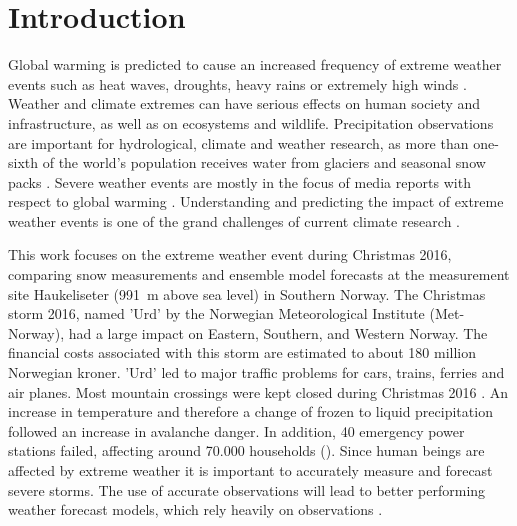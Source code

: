 \chapter{Introduction}
\label{ch:intro}
Global warming is predicted to cause an increased frequency of extreme weather events such as heat waves, droughts, heavy rains or extremely high winds \citep{hansen_warmer_2014}. Weather and climate extremes can have serious effects on human society and infrastructure, as well as on ecosystems and wildlife.
Precipitation observations are important for hydrological, climate and weather research, as more than one-sixth of the world's population receives water from glaciers and seasonal snow packs \citep{barnett_potential_2005}. Severe weather events are mostly in the focus of media reports with respect to global warming \citep{meehl_introduction_2000}. Understanding and predicting the impact of extreme weather events is one of the grand challenges of current climate research \citep{stocker_working_2013,field_summary_2014}.
\par\medskip
\noindent
This work focuses on the extreme weather event during Christmas 2016, comparing snow measurements and ensemble model forecasts at the measurement site Haukeliseter (\SI{991}{\metre} above sea level) in Southern Norway. The Christmas storm 2016, named 'Urd' by the Norwegian Meteorological Institute (Met-Norway), had a large impact on Eastern, Southern, and Western Norway.  %
The financial costs associated with this storm are estimated to about 180 million Norwegian kroner. 'Urd' led to major traffic problems for cars, trains, ferries and air planes. Most mountain crossings were kept closed during Christmas 2016 \citep{olsen_ekstremvaerrapport._2017}. An increase in temperature and therefore a change of frozen to liquid precipitation followed an increase in avalanche danger. In addition, 40 emergency power stations failed, affecting around 70.000 households ().
Since human beings are affected by extreme weather it is important to accurately measure and forecast severe storms. The use of accurate observations will lead to better performing weather forecast models, which rely heavily on observations \citep{joos_influence_2012}. 
